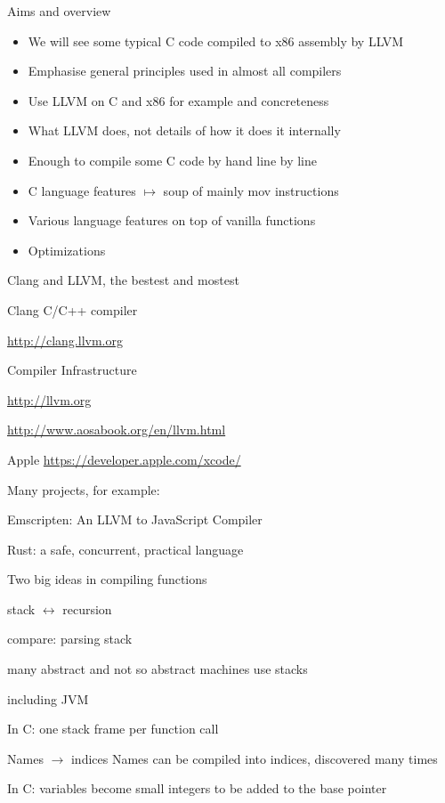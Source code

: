 \documentclass[landscape]{beamer}
\begin{document}
\begin{frame}{Aims and overview}

\begin{itemize}
\item
We will see some typical C code compiled to x86 assembly by LLVM
\item Emphasise general principles used in almost all compilers
\item Use LLVM on C and x86 for example and concreteness
\item
\alert{What} LLVM does, not details of \alert{how} it does it internally
\item
Enough to compile some C code by hand line by line
\item
C language features $\mapsto$ soup of mainly mov instructions
\item
Various language features on top of vanilla functions
\item
Optimizations

\end{itemize}

\end{frame}


\begin{frame}{Clang and LLVM, the bestest and mostest}

Clang C/C++ compiler

\url{http://clang.llvm.org}

Compiler Infrastructure

\url{http://llvm.org}

\url{http://www.aosabook.org/en/llvm.html}

Apple 
\url{https://developer.apple.com/xcode/}

Many projects, for example:

Emscripten: An LLVM to JavaScript Compiler

Rust: a safe, concurrent, practical language

\end{frame}

\begin{frame}{Two big ideas in compiling functions}

\begin{block}{stack $\leftrightarrow$ recursion}

compare: parsing stack

many abstract and not so abstract machines use stacks

including JVM

In C: one stack frame per function call
\end{block}

\begin{block}{Names $\to$ indices}
Names can be compiled into indices, discovered many times

%

In C: variables become small integers to be added to the base pointer

\end{block}

\end{frame}
\end{document}
